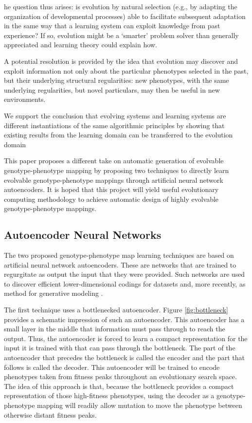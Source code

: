 he question thus arises: is evolution by natural selection (e.g., by adapting the organization of developmental processes) able to facilitate subsequent adaptation in the same way that a learning system can exploit knowledge from past experience? If so, evolution might be a ‘smarter’ problem solver than generally appreciated and learning theory could explain how. \cite{watson2016can}

A potential resolution is provided by the idea that evolution may discover and exploit information not only about the particular phenotypes selected in the past, but their underlying structural regularities: new phenotypes, with the same underlying regularities, but novel particulars, may then be useful in new environments. \cite{kouvaris2017evolution}

We support the conclusion that evolving systems and learning systems are different instantiations of the same algorithmic principles by showing that existing results from the learning domain can be transferred to the evolution domain \cite{kouvaris2017evolution}

This paper proposes a different take on automatic generation of evolvable genotype-phenotype mapping by proposing two techniques to directly learn evolvable genotype-phenotype mappings through artificial neural network autoencoders.
It is hoped that this project will yield useful evolutionary computing methodology to achieve automatic design of highly evolvable genotype-phenotype mappings.

\subsection{Autoencoder Neural Networks}

The two proposed genotype-phenotype map learning techniques are based on artificial neural network autoencoders.
These are networks that are trained to regurgitate as output the input that they were provided.
Such networks are used to discover efficient lower-dimensional codings for datasets and, more recently, as method for generative modeling \cite{liou2014autoencoder, kingma2013auto}.




The first technique uses a bottlenecked autoencoder.
Figure \ref{fig:bottleneck} provides a schematic impression of such an autoencoder.
This autoencoder has a small layer in the middle that information must pass through to reach the output.
Thus, the autoencoder is forced to learn a compact representation for the input it is trained with that can pass through the bottleneck.
The part of the autoencoder that precedes the bottleneck is called the encoder and the part that follows is called the decoder.
This autoencoder will be trained to encode phenotypes taken from fitness peaks throughout an evolutionary search space.
The idea of this approach is that, because the bottleneck provides a compact representation of those high-fitness phenotypes, using the decoder as a genotype-phenotype mapping will readily allow mutation to move the phenotype between otherwise distant fitness peaks.

